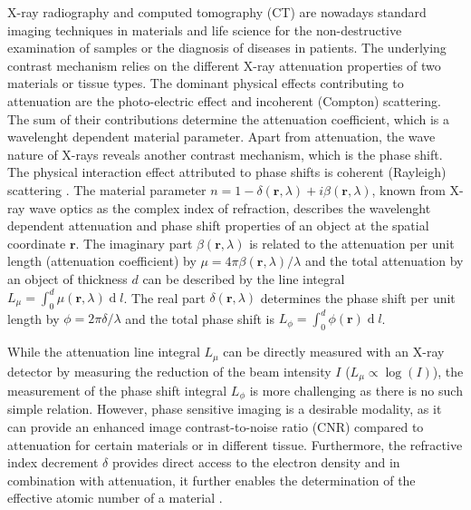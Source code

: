 \documentclass[aip,apl,amsmath,amssymb,floatfix,reprint,a4paper]{revtex4-1}
\renewcommand{\d}[1]{\ensuremath{\operatorname{d}\!{#1}}}
\begin{document}
\maketitle


X-ray radiography and computed tomography (CT) are nowadays standard imaging techniques in materials and life science for the non-destructive examination of samples or the diagnosis of diseases in patients. The underlying contrast mechanism relies on the different X-ray attenuation properties of two materials or tissue types. The dominant physical effects contributing to attenuation are the photo-electric effect and incoherent (Compton) scattering. The sum of their contributions determine the attenuation coefficient, which is a wavelenght dependent material parameter. Apart from attenuation, the wave nature of X-rays reveals another contrast mechanism, which is the phase shift. The physical interaction effect attributed to phase shifts is coherent (Rayleigh) scattering \cite{Als-Nielsen2011}. The material parameter $n=1-\delta(\mathbf{r},\lambda) + i \beta(\mathbf{r},\lambda)$, known from X-ray wave optics as the complex index of refraction, describes the wavelenght dependent attenuation and phase shift properties of an object at the spatial coordinate $\mathbf{r}$. The imaginary part $\beta(\mathbf{r},\lambda)$ is related to the attenuation per unit length (attenuation coefficient) by $\mu = 4 \pi \beta(\mathbf{r},\lambda) / \lambda$ and the total attenuation by an object of thickness $d$ can be described by the line integral $L_\mu = \int_0^d \mu(\mathbf{r},\lambda) \d l$. The real part $\delta(\mathbf{r},\lambda)$ determines the phase shift per unit length by $\phi = 2 \pi \delta / \lambda$ and the total phase shift is $L_\phi = \int_0^d \phi(\mathbf{r}) \d l$.

While the attenuation line integral $L_\mu$ can be directly measured with an X-ray detector by measuring the reduction of the beam intensity $I$ ($L_\mu \propto \log(I)$), the measurement of the phase shift integral $L_\phi$ is more challenging as there is no such simple relation. However, phase sensitive imaging is a desirable modality, as it can provide an enhanced image contrast-to-noise ratio (CNR) compared to attenuation for certain materials or in different tissue. Furthermore, the refractive index decrement $\delta$ provides direct access to the electron density \cite{Als-Nielsen2011} and in combination with attenuation, it further enables the determination of the effective atomic number of a material \cite{Qi2010}.
\end{document}
